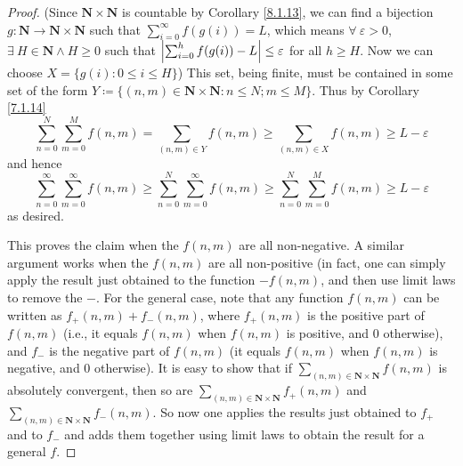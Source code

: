 \begin{proof}
(Since \(\mathbf{N} \times \mathbf{N}\) is countable by Corollary \ref{8.1.13}, we can find a bijection \(g : \mathbf{N} \to \mathbf{N} \times \mathbf{N}\) such that \(\sum_{i = 0}^\infty f(g(i)) = L\), which means \(\forall\ \varepsilon > 0\), \(\exists\ H \in \mathbf{N} \land H \geq 0\) such that \(\abs*{\sum_{i = 0}^h f(g(i)) - L} \leq \varepsilon\) for all \(h \geq H\).
Now we can choose \(X = \{g(i) : 0 \leq i \leq H\}\))
This set, being finite, must be contained in some set of the form \(Y \coloneqq \{(n,m) \in \mathbf{N} \times \mathbf{N} : n \leq N; m \leq M \}\).
Thus by Corollary \ref{7.1.14}
\[
    \sum_{n = 0}^N \sum_{m = 0}^M f(n, m) = \sum_{(n, m) \in Y} f(n, m) \geq \sum_{(n, m) \in X} f(n, m) \geq L - \varepsilon
\]
and hence
\[
    \sum_{n = 0}^\infty \sum_{m = 0}^\infty f(n, m) \geq \sum_{n = 0}^N \sum_{m = 0}^\infty f(n, m) \geq \sum_{n = 0}^N \sum_{m = 0}^M f(n, m) \geq L - \varepsilon
\]
as desired.

This proves the claim when the \(f(n, m)\) are all non-negative.
A similar argument works when the \(f(n, m)\) are all non-positive
(in fact, one can simply apply the result just obtained to the function \(-f(n, m)\), and then use limit laws to remove the \(-\).
For the general case, note that any function \(f(n, m)\) can be written as \(f_+(n, m) + f_-(n, m)\), where \(f_+(n, m)\) is the positive part of \(f(n, m)\)
(i.e., it equals \(f(n, m)\) when \(f(n, m)\) is positive, and \(0\) otherwise),
and \(f_-\) is the negative part of \(f(n, m)\)
(it equals \(f(n, m)\) when \(f(n, m)\) is negative, and \(0\) otherwise).
It is easy to show that if \(\sum_{(n, m) \in \mathbf{N} \times \mathbf{N}} f(n, m)\) is absolutely convergent, then so are \(\sum_{(n, m) \in \mathbf{N} \times \mathbf{N}} f_+(n, m)\) and \(\sum_{(n, m) \in \mathbf{N} \times \mathbf{N}} f_-(n, m)\).
So now one applies the results just obtained to \(f_+\) and to \(f_-\) and adds them together using limit laws to obtain the result for a general \(f\).
\end{proof}